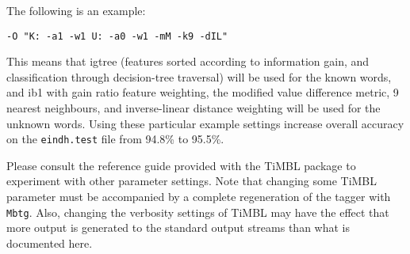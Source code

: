 \documentclass{report}
\begin{document}
The following is an example: 

{\small
\begin{verbatim}
-O "K: -a1 -w1 U: -a0 -w1 -mM -k9 -dIL" 
\end{verbatim}
}

This means that {\sc igtree} (features sorted according to information
gain, and classification through decision-tree traversal) will be used
for the known words, and {\sc ib1} with gain ratio feature weighting,
the modified value difference metric, 9 nearest neighbours, and
inverse-linear distance weighting will be used for the unknown
words. Using these particular example settings increase
overall accuracy on the {\tt eindh.test} file from 94.8\% to 95.5\%.

Please consult the reference guide provided with the TiMBL
package \cite{Daelemans+07} to experiment with other parameter settings. Note that
changing some TiMBL parameter must be accompanied by a complete
regeneration of the tagger with {\tt Mbtg}. Also, changing the
verbosity settings of TiMBL may have the effect that more output
is generated to the standard output streams than what is documented here.



\end{document}
